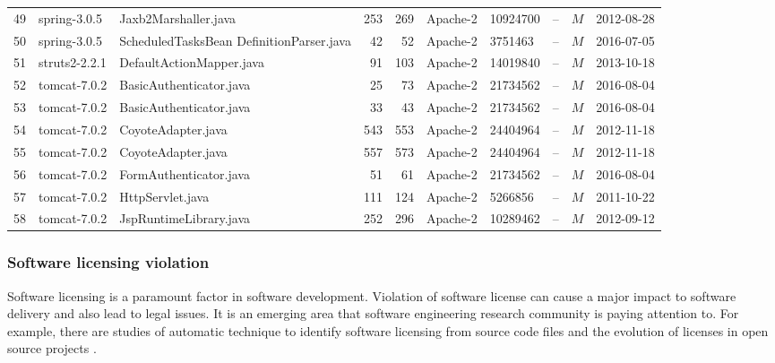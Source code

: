 \documentclass{sig-alternate-05-2015}
\begin{document}
\begin{table}
{\begin{tabular}{r|l|p{4.5cm}|r|r|l|l|l|c|l}
			49 & spring-3.0.5  & Jaxb2Marshaller.java  & 253 & 269 & Apache-2 & 10924700 & -- & $M$  & 2012-08-28 \\
			50 & spring-3.0.5  & ScheduledTasksBean \newline DefinitionParser.java  & 42 & 52 & Apache-2 & 3751463 & -- & $M$  & 2016-07-05 \\
			51 & struts2-2.2.1  & DefaultActionMapper.java  & 91 & 103 & Apache-2 & 14019840 & -- & $M$  & 2013-10-18 \\
			52 & tomcat-7.0.2  & BasicAuthenticator.java  & 25 & 73 & Apache-2 & 21734562 & -- & $M$  & 2016-08-04 \\
			53 & tomcat-7.0.2  & BasicAuthenticator.java  & 33 & 43 & Apache-2 & 21734562 & -- & $M$  & 2016-08-04 \\
			54 & tomcat-7.0.2  & CoyoteAdapter.java  & 543 & 553 & Apache-2 & 24404964 & -- & $M$  & 2012-11-18 \\
			55 & tomcat-7.0.2  & CoyoteAdapter.java  & 557 & 573 & Apache-2 & 24404964 & -- & $M$  & 2012-11-18 \\
			56 & tomcat-7.0.2  & FormAuthenticator.java  & 51 & 61 & Apache-2 & 21734562 & -- & $M$  & 2016-08-04 \\
			57 & tomcat-7.0.2  & HttpServlet.java  & 111 & 124 & Apache-2 & 5266856 & -- & $M$  & 2011-10-22 \\
			58 & tomcat-7.0.2  & JspRuntimeLibrary.java  & 252 & 296 & Apache-2 & 10289462 & -- & $M$  & 2012-09-12 \\
		\hline
	\end{tabular} %
}
\end{table}

\subsubsection{Software licensing violation}
Software licensing is a paramount factor in software development. Violation of software license can cause a major impact to software delivery and also lead to legal issues. It is an emerging area that software engineering research community is paying attention to. For example, there are studies of automatic technique to identify software licensing from source code files \cite{German2010} and the evolution of licenses in open source projects \cite{DiPenta2010}.
\end{document}
